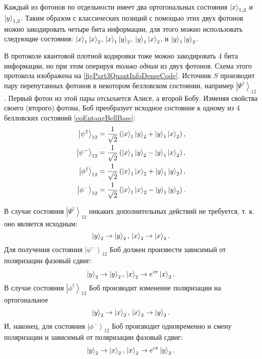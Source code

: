 Каждый из фотонов по отдельности имеет два ортогональных состояния 
$\ket{x}_{1,2}$ и $\ket{y}_{1,2}$. Таким образом с
классических позиций с помощью этих двух фотонов можно закодировать
четыре бита информации, для этого можно использовать следующие
состояния:
$\ket{x}_1 \ket{x}_2$,
$\ket{x}_1 \ket{y}_2$,
$\ket{y}_1 \ket{x}_2$,
и 
$\ket{y}_1 \ket{y}_2$.



В протоколе квантовой плотной кодировки тоже можно закодировать 4
бита информации, но при этом оперируя {\it только одним} из двух 
фотонов. Схема этого протокола изображена на
\autoref{figPart3QuantInfoDenseCode}. Источник $S$ производит пару
перепутанных фотонов в некотором белловском состоянии, например
$\left|\Psi^{\dag}\right>_{12}$.  Первый фотон из этой пары отсылается Алисе,
а второй Бобу. Изменяя свойства своего (второго) фотона, Боб
преобразует исходное состояние к одному из 4 белловских состояний \eqref{eqEntangBellBase}:
\begin{eqnarray}
  \left|\psi^{\dag}\right>_{12} = 
  \frac{1}{\sqrt{2}}\left(
  \ket{x}_1\ket{y}_2 + 
  \ket{y}_1\ket{x}_2
  \right),
  \nonumber \\
  \left|\psi^{-}\right>_{12} = 
  \frac{1}{\sqrt{2}}\left(
  \ket{x}_1\ket{y}_2 - 
  \ket{y}_1\ket{x}_2
  \right),
  \nonumber \\
  \left|\phi^{\dag}\right>_{12} = 
  \frac{1}{\sqrt{2}}\left(
  \ket{x}_1\ket{x}_2 + 
  \ket{y}_1\ket{y}_2
  \right),
  \nonumber \\
  \left|\phi^{-}\right>_{12} = 
  \frac{1}{\sqrt{2}}\left(
  \ket{x}_1\ket{x}_2 - 
  \ket{y}_1\ket{y}_2
  \right).
  \label{eqQuantInfoBellBase}
\end{eqnarray}

В случае состояния $\left|\Psi^{\dag}\right>_{12}$ никаких
дополнительных действий не требуется, т. к. оно является исходным: 
\begin{equation}
\ket{y}_2 \rightarrow \ket{y}_2, \, 
\ket{x}_2 \rightarrow \ket{x}_2.
\label{eqQuantInfoDense1}
\end{equation}
Для получения состояния $\left|\psi^{-}\right>_{12}$ Боб должен
произвести зависимый от поляризации фазовый сдвиг:
\begin{equation}
\ket{y}_2 \rightarrow \ket{y}_2, \, 
\ket{x}_2 \rightarrow e^{i \pi}\ket{x}_2.
\label{eqQuantInfoDense2}
\end{equation}
В случае состояния $\left|\phi^{\dag}\right>_{12}$ Боб производит
изменение поляризации на ортогональное
\begin{equation}
\ket{y}_2 \rightarrow \ket{x}_2, \, 
\ket{x}_2 \rightarrow \ket{y}_2.
\label{eqQuantInfoDense3}
\end{equation}
И, наконец, для состояния $\left|\phi^{-}\right>_{12}$ Боб производит
одновременно и смену поляризации и зависимый от поляризации фазовый
сдвиг:
\begin{equation}
\ket{y}_2 \rightarrow \ket{x}_2, \, 
\ket{x}_2 \rightarrow e^{i \pi}\ket{y}_2.
\label{eqQuantInfoDense4}
\end{equation}

